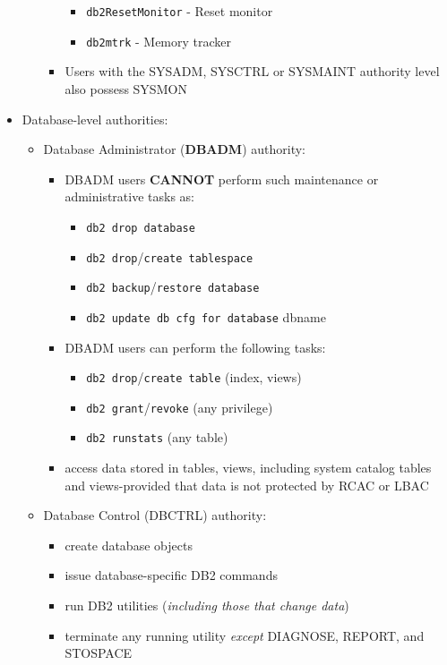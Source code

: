 \documentclass{article}
\begin{document}
\begin{itemize}
\begin{itemize}
\begin{itemize}
\begin{itemize}
		\item \texttt{db2ResetMonitor} - Reset monitor
		\item \texttt{db2mtrk} - Memory tracker
		\end{itemize}
	\item Users with the SYSADM, SYSCTRL or SYSMAINT authority level also possess SYSMON
	\end{itemize}
\end{itemize}
\newpage
\item Database-level authorities:
\begin{itemize}
\item Database Administrator (\textbf{DBADM}) authority:
	\begin{itemize}
	\item DBADM users \textbf{CANNOT} perform such maintenance or administrative tasks as:
		\begin{itemize}
		\item \texttt{db2 drop database}
		\item \texttt{db2 drop}/\texttt{create tablespace}
		\item \texttt{db2 backup}/\texttt{restore database}
		\item \texttt{db2 update db cfg for database} dbname
		\end{itemize}
	\item DBADM users can perform the following tasks:
		\begin{itemize}
		\item \texttt{db2 drop}/\texttt{create table} (index, views)
		\item \texttt{db2 grant}/\texttt{revoke} (any privilege)
		\item \texttt{db2 runstats} (any table)
		\end{itemize}
	\item access data stored in tables, views, including
	system catalog tables and views-provided that data is not protected by RCAC or LBAC
	\end{itemize}
\item Database Control (DBCTRL) authority:
	\begin{itemize}
	\item create database objects
	\item issue database-specific DB2 commands
	\item run DB2 utilities (\textit{including those that change data})
	\item terminate any running utility \textit{except} DIAGNOSE, REPORT, and STOSPACE

\end{itemize}
\end{itemize}
\end{itemize}
\end{document}
